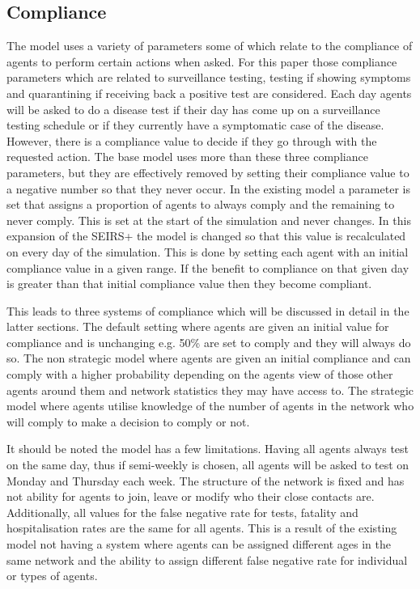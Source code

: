 \documentclass{article}
\begin{document}
\newpage


\subsection{Compliance}
The model uses a variety of parameters some of which relate to the compliance of agents to perform certain actions when asked. For this paper those compliance parameters which are related to surveillance testing, testing if showing symptoms and quarantining if receiving back a positive test are considered. Each day agents will be asked to do a disease test if their day has come up on a surveillance testing schedule or if they currently have a symptomatic case of the disease. However, there is a compliance value to decide if they go through with the requested action. The base model uses more than these three compliance parameters, but they are effectively removed by setting their compliance value to a negative number so that they never occur. In the existing model a parameter is set that assigns a proportion of agents to always comply and the remaining to never comply. This is set at the start of the simulation and never changes. In this expansion of the SEIRS+ the model is changed so that this value is recalculated on every day of the simulation. This is done by setting each agent with an initial compliance value in a given range. If the benefit to compliance on that given day is greater than that initial compliance value then they become compliant. \newline

This leads to three systems of compliance which will be discussed in detail in the latter sections. The default setting where agents are given an initial value for compliance and is unchanging e.g. 50\% are set to comply and they will always do so. The non strategic model where agents are given an initial compliance and can comply with a higher probability depending on the agents view of those other agents around them and network statistics they may have access to. The strategic model where agents utilise knowledge of the number of agents in the network who will comply to make a decision to comply or not.\newline

It should be noted the model has a few limitations. Having all agents always test on the same day, thus if semi-weekly is chosen, all agents will be asked to test on Monday and Thursday each week. The structure of the network is fixed and has not ability for agents to join, leave or modify who their close contacts are. Additionally, all values for the false negative rate for tests, fatality and hospitalisation rates are the same for all agents. This is a result of the existing model not having a system where agents can be assigned different ages in the same network and the ability to assign different false negative rate for individual or types of agents.
\end{document}
